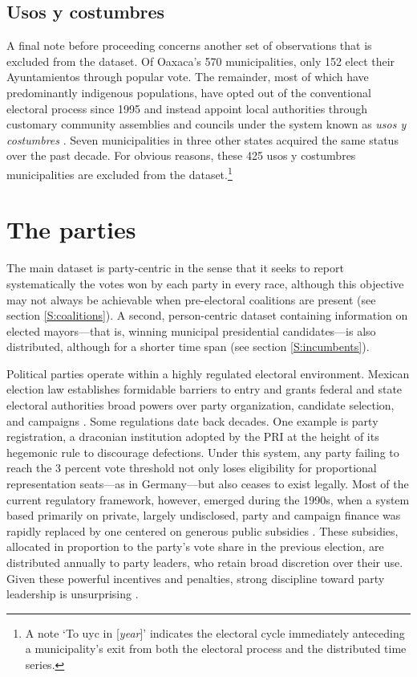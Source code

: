 \documentclass[letter,12pt]{article}
\begin{document}
\subsection{Usos y costumbres}\label{S:uyc}
A final note before proceeding concerns another set of observations that is excluded from the dataset. Of Oaxaca's 570 municipalities, only 152 elect their Ayuntamientos through popular vote. The remainder, most of which have predominantly indigenous populations, have opted out of the conventional electoral process since 1995 and instead appoint local authorities through customary community assemblies and councils under the system known as \emph{usos y costumbres} \citep[see][]{elizarraras.2002, eisenstadt.rios.uyc.2014, magaloni.etal.2021}. Seven municipalities in three other states acquired the same status over the past decade. For obvious reasons, these 425 usos y costumbres municipalities are excluded from the dataset.\footnote{A note `To uyc in [\emph{year}]' indicates the electoral cycle immediately anteceding a municipality's exit from both the electoral process and the distributed time series.}

\section{The parties}
The main dataset is party-centric in the sense that it seeks to report systematically the votes won by each party in every race, although this objective may not always be achievable when pre-electoral coalitions are present (see section \ref{S:coalitions}). A second, person-centric dataset containing information on elected mayors---that is, winning municipal presidential candidates---is also distributed, although for a shorter time span (see section \ref{S:incumbents}). 

Political parties operate within a highly regulated electoral environment. Mexican election law establishes formidable barriers to entry and grants federal and state electoral authorities broad powers over party organization, candidate selection, and campaigns \citep{estevez.ref2007.2007, magar.2007ref.2015}. Some regulations date back decades. One example is party registration, a draconian institution adopted by the PRI at the height of its hegemonic rule to discourage defections. Under this system, any party failing to reach the 3 percent vote threshold not only loses eligibility for proportional representation seats---as in Germany---but also ceases to exist legally. Most of the current regulatory framework, however, emerged during the 1990s, when a system based primarily on private, largely undisclosed, party and campaign finance was rapidly replaced by one centered on generous public subsidies \citep{poire.Money2005}. These subsidies, allocated in proportion to the party's vote share in the previous election, are distributed annually to party leaders, who retain broad discretion over their use. Given these powerful incentives and penalties, strong discipline toward party leadership is unsurprising \citep{weldon.1997}.
\end{document}
